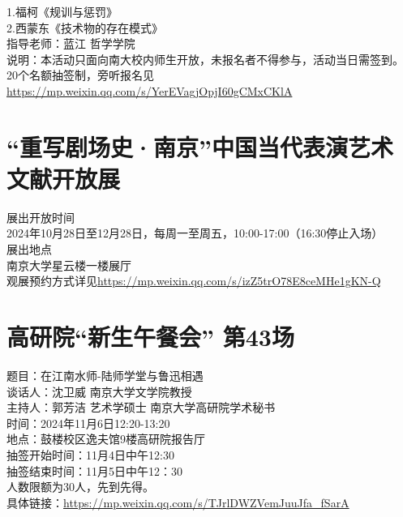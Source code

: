 \documentclass[letterpaper, 12pt]{article}
\begin{document}
\begin{multicols}{2}
1.福柯《规训与惩罚》\\
2.西蒙东《技术物的存在模式》\\
指导老师：蓝江 哲学学院\\
说明：本活动只面向南大校内师生开放，未报名者不得参与，活动当日需签到。
20个名额抽签制，旁听报名见\url{https://mp.weixin.qq.com/s/YerEVagjOpjI60gCMxCKlA}
\section{“重写剧场史·南京”中国当代表演艺术文献开放展}
展出开放时间\\
2024年10月28日至12月28日，每周一至周五，10:00-17:00（16:30停止入场）\\
展出地点\\
南京大学星云楼一楼展厅\\
观展预约方式详见\url{https://mp.weixin.qq.com/s/izZ5trO78E8ceMHe1gKN-Q}\\

\section{高研院“新生午餐会” 第43场}
题目：在江南水师-陆师学堂与鲁迅相遇\\
谈话人：沈卫威 南京大学文学院教授\\
主持人：郭芳洁 艺术学硕士 南京大学高研院学术秘书\\
时间：2024年11月6日12:20-13:20\\
地点：鼓楼校区逸夫馆9楼高研院报告厅\\
抽签开始时间：11月4日中午12:30\\
抽签结束时间：11月5日中午12：30\\
人数限额为30人，先到先得。\\
具体链接：\url{https://mp.weixin.qq.com/s/TJrlDWZVemJuuJfa_fSarA}\\

\end{multicols} 
\end{document}
